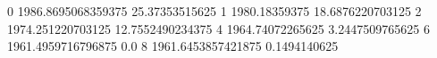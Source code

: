 0 1986.8695068359375 25.37353515625
1 1980.18359375 18.6876220703125
2 1974.251220703125 12.7552490234375
4 1964.74072265625 3.2447509765625
6 1961.4959716796875 0.0
8 1961.6453857421875 0.1494140625
